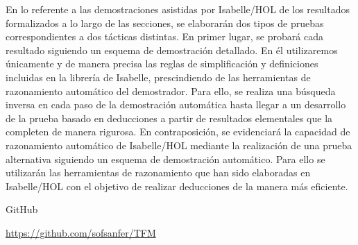 \begin{isabellebody}
\begin{isamarkuptext}
  En lo referente a las demostraciones asistidas por Isabelle/HOL de
  los resultados formalizados a lo largo de las secciones, se elaborarán 
  dos tipos de pruebas correspondientes a dos tácticas distintas. En 
  primer lugar, se probará cada resultado siguiendo un esquema de 
  demostración detallado. En él utilizaremos únicamente y de manera 
  precisa las reglas de simplificación y definiciones incluidas en la 
  librería de Isabelle, prescindiendo de las herramientas de 
  razonamiento automático del demostrador. Para ello, se realiza una 
  búsqueda inversa en cada paso de la demostración automática hasta 
  llegar a un desarrollo de la prueba basado en deducciones a partir de
  resultados elementales que la completen de manera rigurosa. En 
  contraposición, se evidenciará la capacidad de razonamiento 
  automático de Isabelle/HOL mediante la realización de una prueba 
  alternativa siguiendo un esquema de demostración automático. Para 
  ello se utilizarán las herramientas de razonamiento que han sido 
  elaboradas en Isabelle/HOL con el objetivo de realizar deducciones de 
  la manera más eficiente.

   GitHub  

\href{https://github.com/sofsanfer/TFM}
                  {\url{https://github.com/sofsanfer/TFM}}%
\end{isamarkuptext}\isamarkuptrue%
%
\isadelimtheory
%
\endisadelimtheory
%
\isatagtheory
%
\endisatagtheory
{\isafoldtheory}%
%
\isadelimtheory
%
\endisadelimtheory
%
\end{isabellebody}%
\endinput
